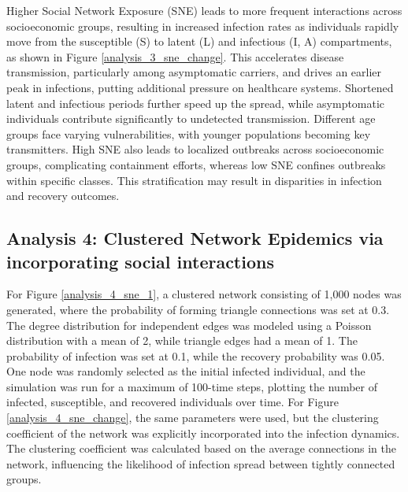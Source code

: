 \documentclass[9 pt]{article} %
\begin{document}
Higher Social Network Exposure (SNE) leads to more frequent interactions across socioeconomic groups, resulting in increased infection rates as individuals rapidly move from the susceptible (S) to latent (L) and infectious (I, A) compartments, as shown in Figure \ref{analysis_3_sne_change}. This accelerates disease transmission, particularly among asymptomatic carriers, and drives an earlier peak in infections, putting additional pressure on healthcare systems. Shortened latent and infectious periods further speed up the spread, while asymptomatic individuals contribute significantly to undetected transmission. Different age groups face varying vulnerabilities, with younger populations becoming key transmitters. High SNE also leads to localized outbreaks across socioeconomic groups, complicating containment efforts, whereas low SNE confines outbreaks within specific classes. This stratification may result in disparities in infection and recovery outcomes.

\subsection{Analysis 4: Clustered Network Epidemics via incorporating social interactions}

For Figure \ref{analysis_4_sne_1}, a clustered network consisting of 1,000 nodes was generated, where the probability of forming triangle connections was set at 0.3. The degree distribution for independent edges was modeled using a Poisson distribution with a mean of 2, while triangle edges had a mean of 1. The probability of infection was set at 0.1, while the recovery probability was 0.05. One node was randomly selected as the initial infected individual, and the simulation was run for a maximum of 100-time steps, plotting the number of infected, susceptible, and recovered individuals over time. For Figure \ref{analysis_4_sne_change}, the same parameters were used, but the clustering coefficient of the network was explicitly incorporated into the infection dynamics. The clustering coefficient was calculated based on the average connections in the network, influencing the likelihood of infection spread between tightly connected groups. 
\end{document}
